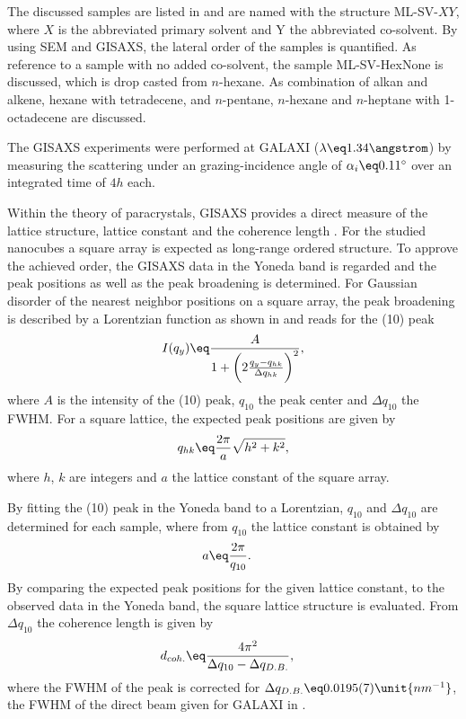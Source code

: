 \documentclass[\main/dresen_thesis.tex]{subfiles}
\begin{document}
      The discussed samples are listed in  and are named with the structure ML-SV-$XY$, where $X$ is the abbreviated primary solvent and Y the abbreviated co-solvent.
      By using SEM and GISAXS, the lateral order of the samples is quantified.
      As reference to a sample with no added co-solvent, the sample ML-SV-HexNone is discussed, which is drop casted from $\mathit{n}$-hexane.
      As combination of alkan and alkene, hexane with tetradecene, and $\mathit{n}$-pentane, $\mathit{n}$-hexane and $\mathit{n}$-heptane with 1-octadecene are discussed.

      The GISAXS experiments were performed at GALAXI ($\lambda \eq 1.34 \angstrom$) by measuring the scattering under an grazing-incidence angle of $\alpha_i \eq 0.11^\circ$ over an integrated time of $4 \unit{h}$ each.

      Within the theory of paracrystals, GISAXS provides a direct measure of the lattice structure, lattice constant and the coherence length \cite{Renaud_2009_Probi}.
      For the studied nanocubes a square array is expected as long-range ordered structure.
      To approve the achieved order, the GISAXS data in the Yoneda band is regarded and the peak positions as well as the peak broadening is determined.
      For Gaussian disorder of the nearest neighbor positions on a square array, the peak broadening is described by a Lorentzian function as shown in  and reads for the (10) peak
      \begin{align}
        I(q_y) \eq \frac{A} {1 + \biggl(2\frac{q_y - q_{hk}}{\Delta q_{hk}}\biggr)^2},
      \end{align}
      where $A$ is the intensity of the (10) peak, $q_{10}$ the peak center and $\Delta q_{10}$ the FWHM.
      For a square lattice, the expected peak positions are given by
      \begin{align}\label{eq:monolayers:preparation:solventVariation:squareLatticeIndices}
        q_{hk} \eq \frac{2 \pi}{a} \sqrt{h^2 + k^2},
      \end{align}
      where $h$, $k$ are integers and $a$ the lattice constant of the square array.

      By fitting the (10) peak in the Yoneda band to a Lorentzian, $q_{10}$ and $\Delta q_{10}$ are determined for each sample, where from $q_{10}$ the lattice constant is obtained by
      \begin{align}
        a &\eq \frac{2 \pi}{q_{10}}.
      \end{align}
      By comparing the expected peak positions for the given lattice constant, to the observed data in the Yoneda band, the square lattice structure is evaluated.
      From $\Delta q_{10}$ the coherence length is given by
      \begin{align}
        d_{coh.} &\eq \frac{4 \pi^2}{\Delta q_{10} - \Delta q_{D.B.}},
      \end{align}
      where the FWHM of the peak is corrected for $\Delta q_{D.B.} \eq 0.0195(7) \unit{nm^{-1}}$, the FWHM of the direct beam given for GALAXI in .
\end{document}
